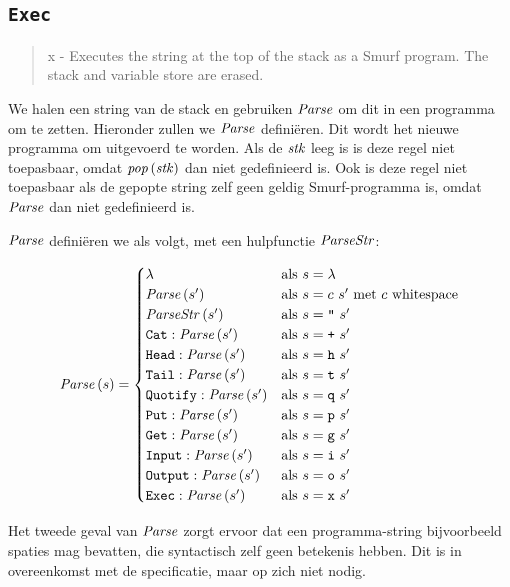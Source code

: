 \subsection{\texttt{Exec}}
\label{sec:rules:exec}

\begin{quote}
	x - Executes the string at the top of the stack as a Smurf program. The stack
	and variable store are erased.
\end{quote}

We halen een string van de stack en gebruiken $\mathit{Parse}$ om dit in een
programma om te zetten. Hieronder zullen we $\mathit{Parse}$ definiëren. Dit wordt
het nieuwe programma om uitgevoerd te worden.  Als de $\mathit{stk}$ leeg is is deze
regel niet toepasbaar, omdat $\mathit{pop}\left(\mathit{stk}\right)$ dan niet gedefinieerd is. Ook is deze
regel niet toepasbaar als de gepopte string zelf geen geldig Smurf-programma
is, omdat $\mathit{Parse}$ dan niet gedefinieerd is.
\therexecns%

\medskip
$\mathit{Parse}$ definiëren we als volgt, met een hulpfunctie $\mathit{ParseStr}$:

$$
	\mathit{Parse}\left(s\right) =
		\begin{cases}
			\lambda                   & \text{als $s=\lambda$}\\
			\mathit{Parse}\left(s'\right)             & \text{als $s=c~s'$ met $c$ whitespace}\\
			\mathit{ParseStr}\left(s'\right)             & \text{als $s=\texttt{"}~s'$} \\
			\texttt{Cat}:\mathit{Parse}\left(s'\right)     & \text{als $s=\texttt{+}~s'$} \\
			\texttt{Head}:\mathit{Parse}\left(s'\right)    & \text{als $s=\texttt{h}~s'$} \\
			\texttt{Tail}:\mathit{Parse}\left(s'\right)    & \text{als $s=\texttt{t}~s'$} \\
			\texttt{Quotify}:\mathit{Parse}\left(s'\right) & \text{als $s=\texttt{q}~s'$} \\
			\texttt{Put}:\mathit{Parse}\left(s'\right)     & \text{als $s=\texttt{p}~s'$} \\
			\texttt{Get}:\mathit{Parse}\left(s'\right)     & \text{als $s=\texttt{g}~s'$} \\
			\texttt{Input}:\mathit{Parse}\left(s'\right)   & \text{als $s=\texttt{i}~s'$} \\
			\texttt{Output}:\mathit{Parse}\left(s'\right)  & \text{als $s=\texttt{o}~s'$} \\
			\texttt{Exec}:\mathit{Parse}\left(s'\right)    & \text{als $s=\texttt{x}~s'$} \\
		\end{cases}
$$

Het tweede geval van $\mathit{Parse}$ zorgt ervoor dat een programma-string
bijvoorbeeld spaties mag bevatten, die syntactisch zelf geen betekenis hebben.
Dit is in overeenkomst met de specificatie, maar op zich niet nodig.

